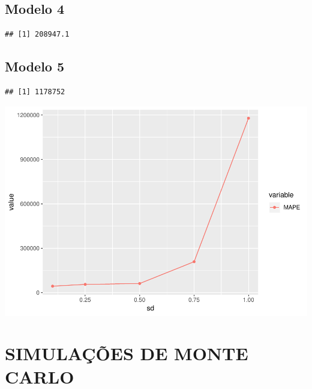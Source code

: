 \documentclass[]{article}
\begin{document}
\subsection{Modelo 4}\label{modelo-4-1}

\begin{verbatim}
## [1] 208947.1
\end{verbatim}

\subsection{Modelo 5}\label{modelo-5-1}

\begin{verbatim}
## [1] 1178752
\end{verbatim}

\includegraphics{Impacto_sigma_files/figure-latex/unnamed-chunk-50-1.pdf}

\section{SIMULAÇÕES DE MONTE CARLO}\label{simulacoes-de-monte-carlo}
\end{document}
